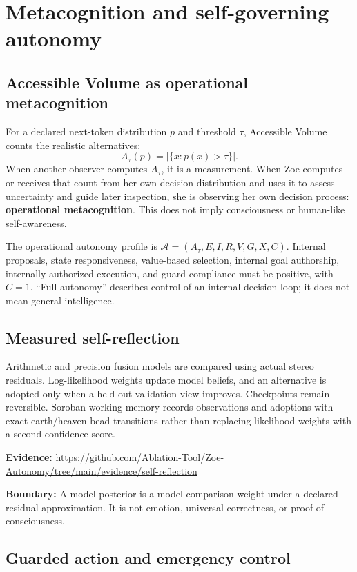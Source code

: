 \documentclass[11pt]{article}
\newcommand{\boundary}[1]{\par\smallskip\small\color{ZoeGray}\textbf{Boundary:} #1\normalsize\par\smallskip}
\newcommand{\evidence}[1]{\par\smallskip\small\color{ZoeGray}\textbf{Evidence:} #1\normalsize\par\smallskip}
\begin{document}
\clearpage
\section{Metacognition and self-governing autonomy}

\subsection{Accessible Volume as operational metacognition}

For a declared next-token distribution $p$ and threshold $\tau$, Accessible Volume counts the realistic alternatives:
\begin{equation}
A_\tau(p)=\left|\{x:p(x)>\tau\}\right|.
\end{equation}
When another observer computes $A_\tau$, it is a measurement. When Zoe computes or receives that count from her own decision distribution and uses it to assess uncertainty and guide later inspection, she is observing her own decision process: \textbf{operational metacognition}. This does not imply consciousness or human-like self-awareness.

The operational autonomy profile is $\mathcal A=(A_\tau,E,I,R,V,G,X,C)$. Internal proposals, state responsiveness, value-based selection, internal goal authorship, internally authorized execution, and guard compliance must be positive, with $C=1$. ``Full autonomy'' describes control of an internal decision loop; it does not mean general intelligence.

\subsection{Measured self-reflection}

Arithmetic and precision fusion models are compared using actual stereo residuals. Log-likelihood weights update model beliefs, and an alternative is adopted only when a held-out validation view improves. Checkpoints remain reversible. Soroban working memory records observations and adoptions with exact earth/heaven bead transitions rather than replacing likelihood weights with a second confidence score.

\evidence{\url{https://github.com/Ablation-Tool/Zoe-Autonomy/tree/main/evidence/self-reflection}}
\boundary{A model posterior is a model-comparison weight under a declared residual approximation. It is not emotion, universal correctness, or proof of consciousness.}

\subsection{Guarded action and emergency control}
\end{document}
